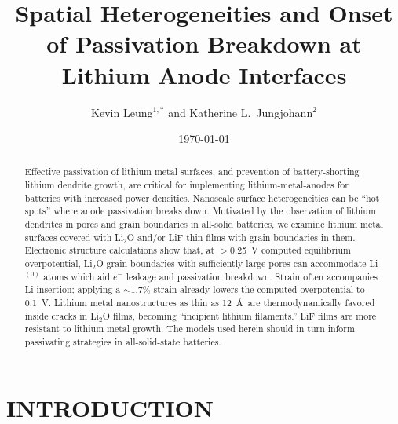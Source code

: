 \documentclass[prb,preprint,amsmath,amssymb]{revtex4}
\begin{document}
\author{Kevin Leung$^{1,*}$ and Katherine L.~Jungjohann$^2$}
\date{\today}
\title{Spatial Heterogeneities and Onset of Passivation 
Breakdown at Lithium Anode Interfaces}
                                                                                

\renewcommand{\thetable}{\arabic{table}}

 
\begin{abstract}

Effective passivation of lithium metal surfaces, and prevention of
battery-shorting lithium dendrite growth, are critical for implementing
lithium-metal-anodes for batteries with increased power densities.  Nanoscale
surface heterogeneities can be ``hot spots'' where anode passivation breaks
down.  Motivated by the observation of lithium dendrites in pores and grain
boundaries in all-solid batteries, we examine lithium metal surfaces covered
with Li$_2$O and/or LiF thin films with grain boundaries in them.  Electronic
structure calculations show that, at $>$0.25~V computed equilibrium
overpotential, Li$_2$O grain boundaries with sufficiently large pores can
accommodate Li$^{(0)}$ atoms which aid $e^-$ leakage and passivation
breakdown.  Strain often accompanies Li-insertion; applying a $\sim$1.7\%
strain already lowers the computed overpotential to 0.1~V.  Lithium metal
nanostructures as thin as 12~\AA\, are thermodynamically favored inside
cracks in Li$_2$O films, becoming ``incipient lithium filaments.''  LiF films
are more resistant to lithium metal growth.  The models used herein should in
turn inform passivating strategies in all-solid-state batteries.

\end{abstract}

\maketitle

\section*{INTRODUCTION}
 
\end{document}
